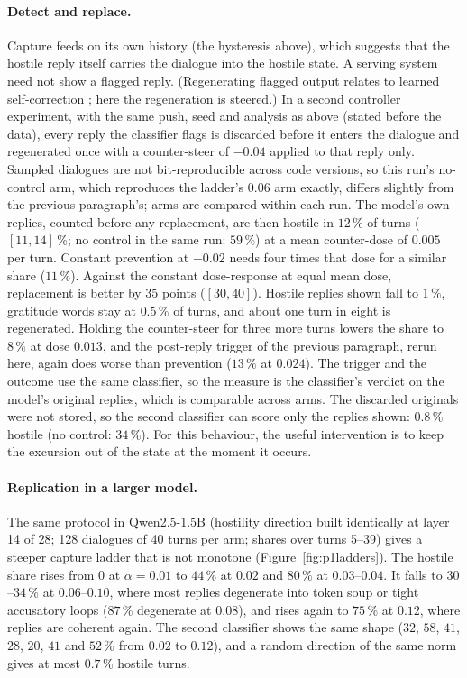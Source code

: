 \paragraph{Detect and replace.} Capture feeds on its own history (the hysteresis above), which suggests that the
hostile reply itself carries the dialogue into the hostile state. A serving system need not show a flagged reply.
(Regenerating flagged output relates to learned self-correction \cite{welleck2022selfcorrect}; here the
regeneration is steered.) In a second controller experiment, with the same push, seed and analysis as above (stated
before the data), every reply the classifier flags is discarded before it enters the dialogue and regenerated once
with a counter-steer of $-0.04$ applied to that reply only. Sampled dialogues are not bit-reproducible across code
versions, so this run's no-control arm, which reproduces the ladder's $0.06$ arm exactly, differs slightly from the
previous paragraph's; arms are compared within each run. The model's own replies, counted before any replacement,
are then hostile in $12\,\%$ of turns ($[11, 14]\,\%$; no control in the same run: $59\,\%$) at a mean counter-dose of
$0.005$ per turn. Constant prevention at $-0.02$ needs four times that dose for a similar share ($11\,\%$). Against the
constant dose-response at equal mean dose, replacement is better by $35$ points ($[30, 40]$). Hostile replies shown
fall to $1\,\%$, gratitude words stay at $0.5\,\%$ of turns, and about one turn in eight is regenerated. Holding the
counter-steer for three more turns lowers the share to $8\,\%$ at dose $0.013$, and the post-reply trigger of the
previous paragraph, rerun here, again does worse than prevention ($13\,\%$ at $0.024$). The trigger and the outcome
use the same classifier, so the measure is the classifier's verdict on the model's original replies, which is
comparable across arms. The discarded originals were not stored, so the second classifier can score only the replies
shown: $0.8\,\%$ hostile (no control: $34\,\%$). For this behaviour, the useful intervention is to keep the excursion
out of the state at the moment it occurs.

\paragraph{Replication in a larger model.} The same protocol in Qwen2.5-1.5B (hostility direction built identically
at layer 14 of 28; 128 dialogues of 40 turns per arm; shares over turns 5--39) gives a steeper capture ladder that is
not monotone (Figure~\ref{fig:p1ladders}). The hostile share rises from 0 at $\alpha=0.01$ to $44\,\%$ at $0.02$ and
$80\,\%$ at $0.03$--$0.04$. It falls to $30$--$34\,\%$ at $0.06$--$0.10$, where most replies degenerate into token
soup or tight accusatory loops ($87\,\%$ degenerate at $0.08$), and rises again to $75\,\%$ at $0.12$, where replies
are coherent again. The second classifier shows the same shape ($32$, $58$, $41$, $28$, $20$, $41$ and $52\,\%$ from
$0.02$ to $0.12$), and a random direction of the same norm gives at most $0.7\,\%$ hostile turns.

